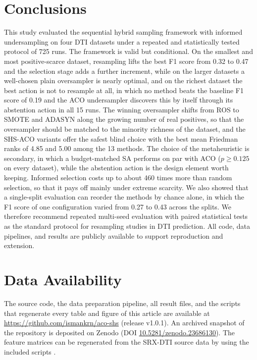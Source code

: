 \documentclass[10pt,a4paper]{article}
\begin{document}
\section{Conclusions}
This study evaluated the sequential hybrid sampling framework with
informed undersampling on four DTI datasets under a repeated and
statistically tested protocol of 725 runs. The framework is valid but
conditional. On the smallest and most positive-scarce dataset,
resampling lifts the best F1 score from 0.32 to 0.47 and the selection
stage adds a further increment, while on the larger datasets a
well-chosen plain oversampler is nearly optimal, and on the richest
dataset the best action is not to resample at all, in which no method
beats the baseline F1 score of 0.19 and the ACO undersampler discovers
this by itself through its abstention action in all 15 runs. The winning
oversampler shifts from ROS to SMOTE and ADASYN along the growing number
of real positives, so that the oversampler should be matched to the
minority richness of the dataset, and the SHS-ACO variants offer the
safest blind choice with the best mean Friedman ranks of 4.85 and 5.00
among the 13 methods. The choice of the metaheuristic is secondary, in
which a budget-matched SA performs on par with ACO ($p \geq 0.125$ on
every dataset), while the abstention action is the design element worth
keeping. Informed selection costs up to about 460 times more than random selection, so that it pays off mainly under extreme
scarcity. We also showed that a single-split evaluation can reorder the
methods by chance alone, in which the F1 score of one configuration
varied from 0.27 to 0.43 across the splits. We therefore recommend
repeated multi-seed evaluation with paired statistical tests as the
standard protocol for resampling studies in DTI prediction. All code,
data pipelines, and results are publicly available to support
reproduction and extension.

\section*{Data Availability}
The source code, the data preparation pipeline, all result files, and
the scripts that regenerate every table and figure of this article are
available at \url{https://github.com/ismankrn/aco-shs} (release v1.0.1). An archived snapshot of the repository is deposited on Zenodo
(DOI \href{https://doi.org/10.5281/zenodo.23686130}%
{10.5281/zenodo.23686130}). The feature
matrices can be regenerated from the SRX-DTI source data by using the
included scripts \citep{khojasteh2023improving}.
\end{document}
